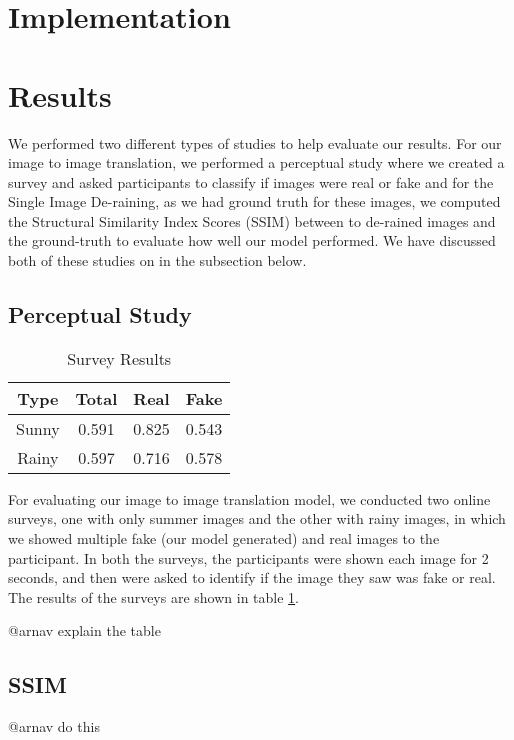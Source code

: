 \documentclass{article}
\begin{document}
\section{Implementation}

\section{Results}

We performed two different types of studies to help evaluate our results. For our image to image translation, we performed a perceptual study where we created a survey and asked participants to classify if images were real or fake and for the Single Image De-raining, as we had ground truth for these images, we computed the Structural Similarity Index Scores (SSIM) between to de-rained images and the ground-truth to evaluate how well our model performed. We have discussed both of these studies on in the subsection below.

\subsection{Perceptual Study}

\begin{table} [h!]
\centering
\begin{tabular}{ | c | c | c | c |}
\hline
 Type & Total & Real & Fake \\ 
\hline
 Sunny &  0.591 & 0.825 & 0.543 \\  
 Rainy & 0.597 & 0.716 & 0.578 \\
 \hline
\end{tabular}
\caption{Survey Results}
\label{table:1}
\end{table}

For evaluating our image to image translation model, we conducted two online surveys, one with only summer images and the other with rainy images, in which we showed multiple fake (our model generated) and real images to the participant. In both the surveys, the participants were shown each image for 2 seconds, and then were asked to identify if the image they saw was fake or real. The results of the surveys are shown in table \ref{table:1}.

@arnav explain the table

\subsection{SSIM}

@arnav do this
\end{document}
